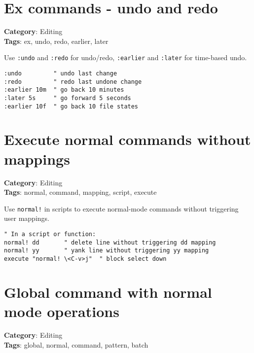 {{{{{\section{Ex commands - undo and redo}

\textbf{Category}: Editing\\ \textbf{Tags}: ex, undo, redo, earlier, later
\vspace{0.5cm}

Use {\footnotesize \Verb§:undo§} and {\footnotesize \Verb§:redo§} for undo/redo, {\footnotesize \Verb§:earlier§} and {\footnotesize \Verb§:later§} for time-based undo.

\begin{Exa*}{}
\begin{Verbatim}[fontsize=\footnotesize, breaklines, breakanywhere]
:undo         " undo last change
:redo         " redo last undone change
:earlier 10m  " go back 10 minutes
:later 5s     " go forward 5 seconds
:earlier 10f  " go back 10 file states
\end{Verbatim}
\end{Exa*}

\section{Execute normal commands without mappings}

\textbf{Category}: Editing\\ \textbf{Tags}: normal, command, mapping, script, execute
\vspace{0.5cm}

Use {\footnotesize \Verb§normal!§} in scripts to execute normal-mode commands without triggering user mappings.

\begin{Exa*}{}
\begin{Verbatim}[fontsize=\footnotesize, breaklines, breakanywhere]
" In a script or function:
normal! dd       " delete line without triggering dd mapping
normal! yy       " yank line without triggering yy mapping
execute "normal! \<C-v>j"  " block select down
\end{Verbatim}
\end{Exa*}

\section{Global command with normal mode operations}

\textbf{Category}: Editing\\ \textbf{Tags}: global, normal, command, pattern, batch
\vspace{0.5cm}

}}}}}

